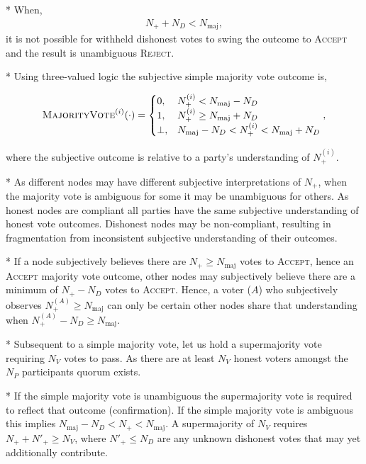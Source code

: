 * When,
\begin{align}
	N_+ + N_D < N_\mathrm{maj},
\end{align}
it is not possible for withheld dishonest votes to swing the outcome to \textsc{Accept} and the result is unambiguous \textsc{Reject}.

* Using three-valued logic the subjective simple majority vote outcome is,
\begin{widetext}
\begin{align*}
	\textsc{MajorityVote}^{(i)}(\cdot) = \begin{cases}
 			0, &N_+^{(i)} < N_\mathrm{maj} - N_D \\
 			1, &N_+^{(i)} \geq N_\mathrm{maj} + N_D\\
 			\bot, &N_\mathrm{maj} - N_D < N_+^{(i)} < N_\mathrm{maj} + N_D
	\end{cases},
\end{align*}
\end{widetext}
where the subjective outcome is relative to a party's understanding of $N_+^{(i)}$.

* As different nodes may have different subjective interpretations of $N_+$, when the majority vote is ambiguous for some it may be unambiguous for others. As honest nodes are compliant all parties have the same subjective understanding of honest vote outcomes. Dishonest nodes may be non-compliant, resulting in fragmentation from inconsistent subjective understanding of their outcomes.

* If a node subjectively believes there are $N_+ \geq N_\mathrm{maj}$ votes to \textsc{Accept}, hence an \textsc{Accept} majority vote outcome, other nodes may subjectively believe there are a minimum of $N_+ - N_D$ votes to \textsc{Accept}. Hence, a voter ($A$) who subjectively observes $N_+^{(A)} \geq N_\mathrm{maj}$ can only be certain other nodes share that understanding when $N_+^{(A)} - N_D \geq N_\mathrm{maj}$.

* Subsequent to a simple majority vote, let us hold a supermajority vote requiring $N_V$ votes to pass. As there are at least $N_V$ honest voters amongst the $N_P$ participants quorum exists.

* If the simple majority vote is unambiguous the supermajority vote is required to reflect that outcome (confirmation). If the simple majority vote is ambiguous this implies $N_\mathrm{maj} - N_D < N_+ < N_\mathrm{maj}$. A supermajority of $N_V$ requires $N_+ + N'_+ \geq N_V$, where $N'_+\leq N_D$ are any unknown dishonest votes that may yet additionally contribute.

